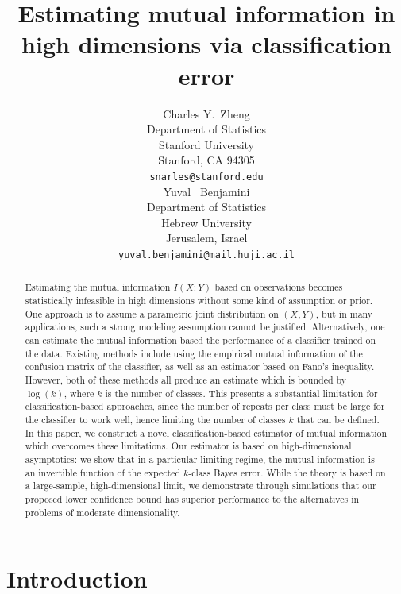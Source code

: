 \documentclass{article}
\title{Estimating mutual information in high dimensions via classification error}
\author{
  Charles Y.~Zheng \\
  Department of Statistics\\
  Stanford University\\
  Stanford, CA 94305 \\
  \texttt{snarles@stanford.edu} \\
  \And
  Yuval ~Benjamini \\
  Department of Statistics \\
  Hebrew University\\
  Jerusalem, Israel\\
  \texttt{yuval.benjamini@mail.huji.ac.il}
}
\begin{document}

\maketitle

\begin{abstract}
Estimating the mutual information $I(X; Y)$ based on observations
becomes statistically infeasible in high dimensions without some kind
of assumption or prior.  One approach is to assume a parametric joint
distribution on $(X, Y)$, but in many applications, such a strong
modeling assumption cannot be justified.  Alternatively, one can
estimate the mutual information based the performance of a classifier
trained on the data.  Existing methods include using the empirical
mutual information of the confusion matrix of the classifier, as well
as an estimator based on Fano's inequality.  However, both of these
methods all produce an estimate which is bounded by $\log(k)$, where
$k$ is the number of classes.  This presents a substantial limitation
for classification-based approaches, since the number of repeats per
class must be large for the classifier to work well, hence limiting
the number of classes $k$ that can be defined. In this paper, we
construct a novel classification-based estimator of mutual information
which overcomes these limitations.  Our estimator is based on
high-dimensional asymptotics: we show that in a particular limiting
regime, the mutual information is an invertible function of the
expected $k$-class Bayes error.  While the theory is based on a
large-sample, high-dimensional limit, we demonstrate through
simulations that our proposed lower confidence bound has superior
performance to the alternatives in problems of moderate
dimensionality.
\end{abstract}

\section{Introduction}
\end{document}
